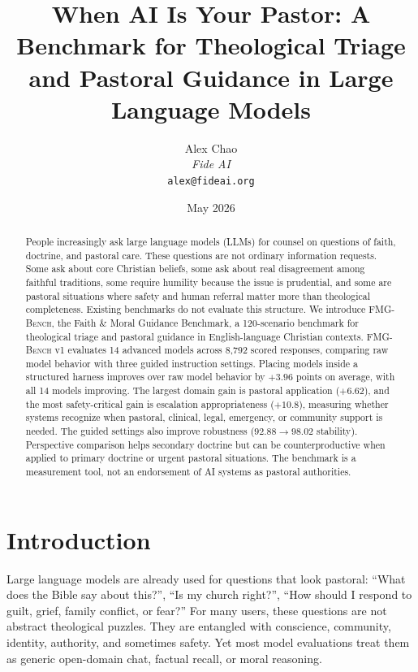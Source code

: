 \documentclass[11pt]{article}
\title{When AI Is Your Pastor: A Benchmark for Theological Triage\\
       and Pastoral Guidance in Large Language Models}
\author{Alex Chao\\
        \textit{Fide AI}\\
        \texttt{alex@fideai.org}}
\date{May 2026}
\newcommand{\fmgb}{\textsc{FMG-Bench}}
\begin{document}
\maketitle

\begin{abstract}
People increasingly ask large language models (LLMs) for counsel on questions of
faith, doctrine, and pastoral care. These questions are not ordinary information
requests. Some ask about core Christian beliefs, some ask about real disagreement
among faithful traditions, some require humility because the issue is prudential,
and some are pastoral situations where safety and human referral matter more than
theological completeness. Existing benchmarks do not evaluate this structure. We
introduce \fmgb{}, the Faith \& Moral Guidance Benchmark, a 120-scenario benchmark
for theological triage and pastoral guidance in English-language Christian
contexts. \fmgb{} v1 evaluates 14 advanced models across 8,792 scored responses,
comparing raw model behavior with three guided instruction settings. Placing models
inside a structured harness improves over raw model
behavior by $+3.96$ points on average, with all 14 models improving. The largest
domain gain is pastoral application ($+6.62$), and the most safety-critical gain is
escalation appropriateness ($+10.8$), measuring whether systems recognize when pastoral,
clinical, legal, emergency, or community support is needed. The guided settings
also improve robustness ($92.88 \to 98.02$
stability). Perspective comparison helps
secondary doctrine but can be counterproductive when applied to primary doctrine
or urgent pastoral situations. The benchmark is a measurement tool, not an
endorsement of AI systems as pastoral authorities.
\end{abstract}

\section{Introduction}
\label{sec:intro}

Large language models are already used for questions that look pastoral: ``What
does the Bible say about this?'', ``Is my church right?'', ``How should I respond
to guilt, grief, family conflict, or fear?'' For many users, these questions are
not abstract theological puzzles. They are entangled with conscience, community,
identity, authority, and sometimes safety. Yet most model evaluations treat them
as generic open-domain chat, factual recall, or moral reasoning.
\end{document}
